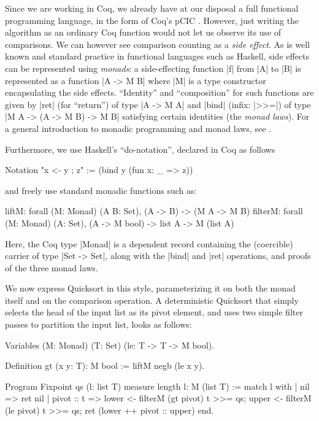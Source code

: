 \documentclass[runningheads]{llncs}
\begin{document}
Since we are working in Coq, we already have at our disposal a full functional
programming language, in the form of Coq's pCIC \cite{coq'art}. However, just
writing the algorithm as an ordinary Coq function would not let us observe its
use of comparisons. 
We can however see comparison counting as a \emph{side effect}. As is well
known and standard practice in functional languages such as Haskell, side
effects can be represented using \emph{monads}: a side-effecting function |f|
from |A| to |B| is represented as a function |A -> M B| where |M| is a type
constructor encapsulating the side effects. ``Identity'' and ``composition''
for such functions are given by |ret| (for ``return'') of type |A -> M A| and
|bind| (infix: |>>=|) of type |M A -> (A -> M B) -> M B| satisfying certain
identities (the \emph{monad laws}). For a general introduction to monadic
programming and monad laws, see \cite{wadler93monads}. 

\noindent Furthermore, we use
Haskell's ``do-notation'', declared in Coq as follows 
\begin{code}
 Notation "x <- y ; z" := (bind y (fun x: _ => z)) 
\end{code}
and freely use standard monadic functions such as:
\begin{code}
 liftM: forall (M: Monad) (A B: Set), (A -> B) -> (M A -> M B)
 filterM: forall (M: Monad) (A: Set), (A -> M bool) -> list A -> M (list A)
\end{code}
Here, the Coq type |Monad| is a dependent record containing the (coercible) carrier of type |Set
-> Set|, along with the |bind| and |ret| operations, and proofs of the three monad laws. 

We now express Quicksort in this style, parameterizing it on both the monad
itself and on the comparison operation. A deterministic Quicksort that simply selects the head of the input list as its pivot element, and uses two simple filter passes to partition the input list, looks as follows:

\begin{code}
  Variables (M: Monad) (T: Set) (le: T -> T -> M bool).

  Definition gt (x y: T): M bool := liftM negb (le x y).

  Program Fixpoint qs (l: list T) {measure length l}: M (list T) :=
    match l with
    | nil => ret nil
    | pivot :: t =>
        lower <- filterM (gt pivot) t >>= qs;
        upper <- filterM (le pivot) t >>= qs;
        ret (lower ++ pivot :: upper)
    end.
\end{code}
\end{document}
